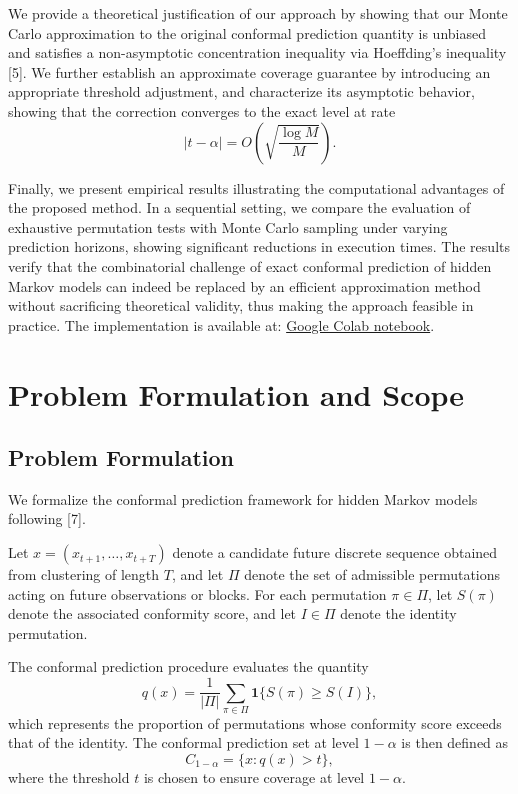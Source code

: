 \documentclass{article}
\begin{document}
We provide a theoretical justification of our approach by showing that our Monte Carlo approximation to the original conformal prediction quantity is unbiased and satisfies a non-asymptotic concentration inequality via Hoeffding’s inequality [5]. We further establish an approximate coverage guarantee by introducing an appropriate threshold adjustment, and characterize its asymptotic behavior, showing that the correction converges to the exact level at rate
\[
|t - \alpha| = O\left(\sqrt{\frac{\log M}{M}}\right).
\]

Finally, we present empirical results illustrating the computational advantages of the proposed method. In a sequential setting, we compare the evaluation of exhaustive permutation tests with Monte Carlo sampling under varying prediction horizons, showing significant reductions in execution times. The results verify that the combinatorial challenge of exact conformal prediction of hidden Markov models can indeed be replaced by an efficient approximation method without sacrificing theoretical validity, thus making the approach feasible in practice.
The implementation is available at:
\href{https://colab.research.google.com/drive/12J1AtzIR90r0Osa5-cmWRgQ2X8j_Xd24?usp=sharing}{Google Colab notebook}.

\section{Problem Formulation and Scope}

\subsection{Problem Formulation}

We formalize the conformal prediction framework for hidden Markov models following [7].

Let $x = (x_{t+1}, \ldots, x_{t+T})$ denote a candidate future discrete sequence obtained from clustering of length $T$, and let $\Pi$ denote the set of admissible permutations acting on future observations or blocks. For each permutation $\pi \in \Pi$, let $S(\pi)$ denote the associated conformity score, and let $I \in \Pi$ denote the identity permutation.

The conformal prediction procedure evaluates the quantity
\[
q(x) = \frac{1}{|\Pi|} \sum_{\pi \in \Pi} \mathbf{1}\{S(\pi) \ge S(I)\},
\]
which represents the proportion of permutations whose conformity score exceeds that of the identity. The conformal prediction set at level $1-\alpha$ is then defined as
\[
C_{1-\alpha} = \{x : q(x) > t\},
\]
where the threshold $t$ is chosen to ensure coverage at level $1-\alpha$.
\end{document}
